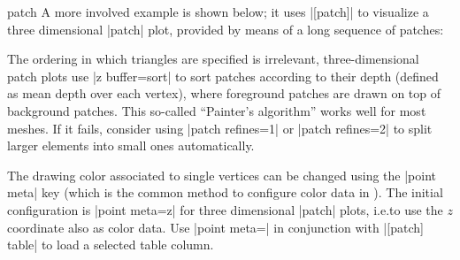 {\begin{plottype}[/pgfplots]{patch}
    A more involved example is shown below; it uses |[patch]| to
    visualize a three dimensional |patch| plot, provided by means of a long
    sequence of patches:
\pgfplotsexpensiveexample
\begin{codeexample}[]
\end{codeexample}
    \noindent The ordering in which triangles are specified is irrelevant,
    three-dimensional patch plots use |z buffer=sort| to sort patches according
    to their depth (defined as mean depth over each vertex), where foreground
    patches are drawn on top of background patches. This so-called ``Painter's
    algorithm'' works well for most meshes. If it fails, consider using
    |patch refines=1| or |patch refines=2| to split larger elements into small
    ones automatically.

    The drawing color associated to single vertices can be changed using the
    |point meta| key (which is the common method to configure color data in
    \PGFPlots). The initial configuration is |point meta=z| for three
    dimensional |patch| plots, i.e.\@ to use the $z$ coordinate also as color
    data. Use |point meta=\thisrow| in conjunction with
    |[patch] table| to load a selected table column.


\end{plottype}}
